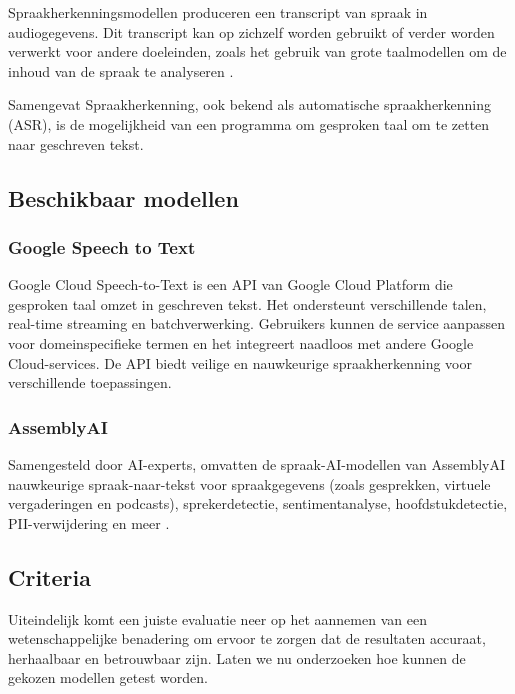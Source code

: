Spraakherkenningsmodellen produceren een transcript van spraak in audiogegevens. Dit transcript kan op zichzelf worden gebruikt of verder worden verwerkt voor andere doeleinden, zoals het gebruik van grote taalmodellen om de inhoud van de spraak te analyseren \autocite{OConnor2023}.

Samengevat Spraakherkenning, ook bekend als automatische spraakherkenning (ASR), is de mogelijkheid van een programma om gesproken taal om te zetten naar geschreven tekst.

\subsection{Beschikbaar modellen}
\subsubsection{Google Speech to Text}

Google Cloud Speech-to-Text is een API van Google Cloud Platform die gesproken taal omzet in geschreven tekst. Het ondersteunt verschillende talen, real-time streaming en batchverwerking. Gebruikers kunnen de service aanpassen voor domeinspecifieke termen en het integreert naadloos met andere Google Cloud-services. De API biedt veilige en nauwkeurige spraakherkenning voor verschillende toepassingen.\autocite{DocsGoogle}
\subsubsection{AssemblyAI}
Samengesteld door AI-experts, omvatten de spraak-AI-modellen van AssemblyAI nauwkeurige spraak-naar-tekst voor spraakgegevens (zoals gesprekken, virtuele vergaderingen en podcasts), sprekerdetectie, sentimentanalyse, hoofdstukdetectie, PII-verwijdering en meer \autocite{DocsAssemblyai}.
\subsection{Criteria}
Uiteindelijk komt een juiste evaluatie neer op het aannemen van een wetenschappelijke benadering om ervoor te zorgen dat de resultaten accuraat, herhaalbaar en betrouwbaar zijn. Laten we nu onderzoeken hoe kunnen de gekozen modellen getest worden.


